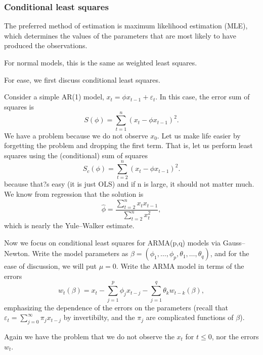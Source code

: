 \documentclass[
paper=128mm:96mm, %
fontsize=9.5pt, %
pagesize, %
parskip=half-, %
]{scrartcl} %
\theoremstyle{mythmstyle} %
\begin{document}
\subsubsection{Conditional least squares}


The preferred method of estimation is maximum likelihood estimation (MLE), which determines the values of the parameters that are most likely to have produced the observations. 

For normal models, this is the same as weighted least squares. 

For ease, we first discuss conditional least squares.
\clearpage


Consider a simple AR(1) model, $x_t=\phi x_{t-1}+\varepsilon_t$. In this case, the error sum of squares is
%
\begin{equation}
S\left(\phi\right)=\sum_{t=1}^n\left(x_t-\phi x_{t-1}\right)^2.
\end{equation}
%
We have a problem because we do not observe $x_0$. Let us make life easier by forgetting the problem and dropping the first term. That is, let us perform least squares using the (conditional) sum of squares
%
\begin{equation}
S_c\left(\phi\right)=\sum_{t=2}^n\left(x_t-\phi x_{t-1}\right)^2.
\end{equation}
%
because that?s easy (it is just OLS) and if n is large, it should not matter much. We
know from regression that the solution is
%
\begin{equation}
\widehat{\phi}=\frac{\sum_{t=2}^n x_tx_{t-1}}{\sum_{t=2}^n x_t^2},
\end{equation}
%
which is nearly the Yule--Walker estimate.
\clearpage




Now we focus on conditional least squares for ARMA(p,q) models via
Gauss--Newton. Write the model parameters as $\beta=\left(\phi_1,\dots,\phi_p,\theta_1,\dots,\theta_q\right)$, and for the ease of discussion, we will put $\mu=0$. Write the ARMA model in terms of the errors
%
\begin{equation}
\label{eq:arma_wei_mle}
w_t\left(\beta\right)=x_t-\sum_{j=1}^p\phi_jx_{t-j}-\sum_{j=1}^q\theta_kw_{t-k}\left(\beta\right),
\end{equation}
%
emphasizing the dependence of the errors on the parameters (recall that $\varepsilon_t=\sum_{j=0}^\infty\pi_j x_{t-j}$ by invertibilty, and the $\pi_j$ are complicated functions of $\beta$). 

Again we have the problem that we do not observe the $x_t$ for $t\leq 0$, nor the
errors $w_t$. 
\end{document}
